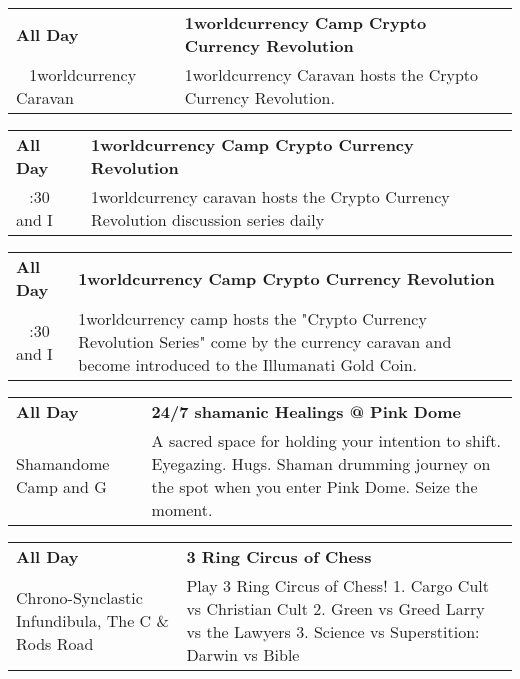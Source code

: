 
\tiny{}

\begin{tabular}{ p{1in} p{2.2in} }
    \textbf{All Day} & \textbf{1worldcurrency Camp Crypto Currency Revolution} \\
    ~ \newline 1worldcurrency Caravan & 1worldcurrency Caravan hosts the Crypto Currency Revolution. \\
    \hline 
\end{tabular}
    
\begin{tabular}{ p{1in} p{2.2in} }
    \textbf{All Day} & \textbf{1worldcurrency Camp Crypto Currency Revolution} \\
    ~ \newline 7:30 and I & 1worldcurrency caravan hosts the Crypto Currency Revolution discussion series daily \\
    \hline 
\end{tabular}
    
\begin{tabular}{ p{1in} p{2.2in} }
    \textbf{All Day} & \textbf{1worldcurrency Camp Crypto Currency Revolution} \\
    ~ \newline 7:30 and I & 1worldcurrency camp hosts the "Crypto Currency Revolution Series" come by the currency caravan and become introduced to the Illumanati Gold Coin. \\
    \hline 
\end{tabular}
    
\begin{tabular}{ p{1in} p{2.2in} }
    \textbf{All Day} & \textbf{24/7 shamanic Healings @ Pink Dome} \\
    Shamandome Camp \newline 615 and G & A sacred space for holding your intention to shift. Eyegazing. Hugs. Shaman drumming journey on the spot when you enter Pink Dome. Seize the moment. \\
    \hline 
\end{tabular}
    
\begin{tabular}{ p{1in} p{2.2in} }
    \textbf{All Day} & \textbf{3 Ring Circus of Chess } \\
    Chrono-Synclastic Infundibula, The \newline C \& Rods Road & Play 3 Ring Circus of Chess!
1. Cargo Cult vs Christian Cult 
2. Green vs Greed
Larry vs the Lawyers
3. Science vs Superstition:
Darwin vs Bible \\
    \hline 
\end{tabular}
    
